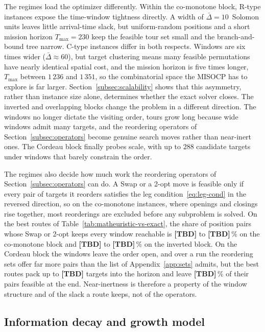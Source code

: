 \documentclass[11pt]{article}
\newcommand{\tbd}{\textbf{[TBD]}}   %
\let\originalsubsection\subsection
\renewcommand{\subsection}{\FloatBarrier\originalsubsection}
\begin{document}
The regimes load the optimizer differently. Within the co-monotone block, R-type instances expose the time-window tightness directly. A width of $\bar\Delta = 10$~Solomon units leaves little arrival-time slack, but uniform-random positions and a short mission horizon $T_{\max} = 230$ keep the feasible tour set small and the branch-and-bound tree narrow. C-type instances differ in both respects. Windows are six times wider ($\bar\Delta \approx 60$), but target clustering means many feasible permutations have nearly identical spatial cost, and the mission horizon is five times longer, $T_{\max}$ between $1\,236$ and $1\,351$, so the combinatorial space the MISOCP has to explore is far larger. Section~\ref{subsec:scalability} shows that this asymmetry, rather than instance size alone, determines whether the exact solver closes. The inverted and overlapping blocks change the problem in a different direction. The windows no longer dictate the visiting order, tours grow long because wide windows admit many targets, and the reordering operators of Section~\ref{subsec:operators} become genuine search moves rather than near-inert ones. The Cordeau block finally probes scale, with up to $288$ candidate targets under windows that barely constrain the order.

The regimes also decide how much work the reordering operators of Section~\ref{subsec:operators} can do. A Swap or a 2-opt move is feasible only if every pair of targets it reorders satisfies the leg condition~\eqref{eq:leg-cond} in the reversed direction, so on the co-monotone instances, where openings and closings rise together, most reorderings are excluded before any subproblem is solved. On the best routes of Table~\ref{tab:matheuristic-vs-exact}, the share of position pairs whose Swap or 2-opt keeps every window reachable is \tbd{} to \tbd{}\,\% on the co-monotone block and \tbd{} to \tbd{}\,\% on the inverted block. On the Cordeau block the windows leave the order open, and over a run the reordering sets offer far more pairs than the list of Appendix~\ref{app:sets} admits, but the best routes pack up to \tbd{} targets into the horizon and leave \tbd{}\,\% of their pairs feasible at the end.%
 Near-inertness is therefore a property of the window structure and of the slack a route keeps, not of the operators.

\subsection{Information decay and growth model}\label{subsec:info-model}
\end{document}
